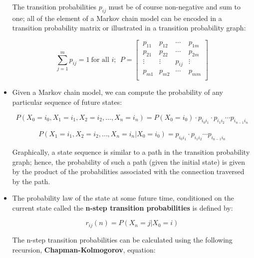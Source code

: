 \documentclass[12pt]{report}
\renewcommand{\_}{\kern-1.5pt\textunderscore\kern-1.5pt}
\begin{document}
\begin{itemize}
The transition probabilities  \( p_{ij} \)  must be of course non-negative and sum to one; all of the element of a Markov chain model can be encoded in a transition probability matrix or illustrated in a transition probability graph:\par

 \[  \sum _{j=1}^{m}p_{ij}=1~ \mathrm{\text{for all }}i;~~P= \left[ ~\begin{matrix}
p_{11}  &  p_{12}  &   \cdots   &  p_{1m}\\
p_{21}  &  p_{22}  &   \cdots   &  p_{2m}\\
 \vdots   &   \vdots   &  p_{ij}  &   \vdots \\
p_{m1}  &  p_{m2}  &   \cdots   &  p_{mm}\\
\end{matrix}
 \right]  \] \par

	\item Given a Markov chain model, we can compute the probability of any particular sequence of future states:\par

 \[ P \left( X_{0}=i_{0},X_{1}=i_{1},X_{2}=i_{2}, \ldots ,X_{n}=i_{n} \right) =P \left( X_{0}=i_{0} \right)  \cdot p_{i_{0}i_{1}} \cdot p_{i_{1}i_{2}} \cdots p_{i_{n-1}i_{n}} \] \par

 \[ P \left( X_{1}=i_{1},X_{2}=i_{2}, \ldots ,X_{n}=i_{n} \vert X_{0}=i_{0} \right) =p_{i_{0}i_{1}} \cdot p_{i_{1}i_{2}} \cdots p_{i_{n-1}i_{n}} \] \par

Graphically, a state sequence is similar to a path in the transition probability graph; hence, the probability of such a path (given the initial state) is given by the product of the probabilities associated with the connection traversed by the path.\par

	\item The probability law of the state at some future time, conditioned on the current state called the \textbf{n-step transition probabilities} is defined by:\par

 \[ r_{ij} \left( n \right) =P \left( X_{n}=j \vert X_{0}=i \right)  \] \par

The n-step transition probabilities can be calculated using the following recursion, \textbf{Chapman-Kolmogorov}, equation:\par


\end{itemize}
\end{document}
